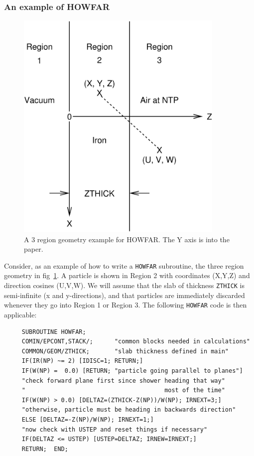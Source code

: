 \subsubsection{An example of HOWFAR}

\begin{figure}[hrbt]
   \begin{center}
   \leavevmode
   \mbox{}\hspace{-1mm}
   \includegraphics[width=10cm]{figures/3_region_ex}
   \end{center}
   \caption{A 3 region geometry example for HOWFAR.  The Y axis is into the
paper.}
   \label{fig_3_region_ex}
\end{figure}
Consider, as an example of how to write a {\tt HOWFAR} subroutine, the three
region geometry in fig~\ref{fig_3_region_ex}.  A particle is shown in
Region 2 with coordinates (X,Y,Z) and direction cosines (U,V,W).  We will
assume that the slab of thickness {\tt ZTHICK} is semi-infinite (x and
y-directions), and that particles are immediately discarded whenever they
go into Region 1 or Region 3.  The following {\tt HOWFAR} code is then
applicable:
\begin{verbatim}
     SUBROUTINE HOWFAR;
     COMIN/EPCONT,STACK/;      "common blocks needed in calculations"
     COMMON/GEOM/ZTHICK;       "slab thickness defined in main"
     IF(IR(NP) ~= 2) [IDISC=1; RETURN;]
     IF(W(NP) =  0.0) [RETURN; "particle going parallel to planes"]
     "check forward plane first since shower heading that way"
     "                                       most of the time"
     IF(W(NP) > 0.0) [DELTAZ=(ZTHICK-Z(NP))/W(NP); IRNEXT=3;]
     "otherwise, particle must be heading in backwards direction"
     ELSE [DELTAZ=-Z(NP)/W(NP); IRNEXT=1;]
     "now check with USTEP and reset things if necessary"
     IF(DELTAZ <= USTEP) [USTEP=DELTAZ; IRNEW=IRNEXT;]
     RETURN;  END;
\end{verbatim}

